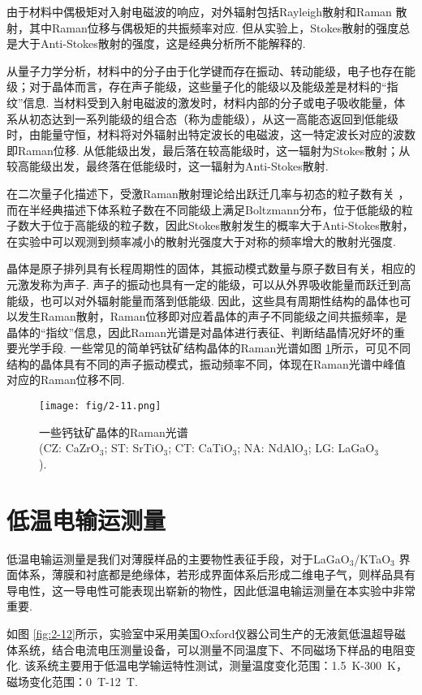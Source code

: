 \documentclass[12pt,a4paper,openany,twoside,UTF-8]{book}
\begin{document}
由于材料中偶极矩对入射电磁波的响应，对外辐射包括Rayleigh散射和Raman 散射，其中Raman位移与偶极矩的共振频率对应. 但从实验上，Stokes散射的强度总是大于Anti-Stokes散射的强度，这是经典分析所不能解释的. 

从量子力学分析，材料中的分子由于化学键而存在振动、转动能级，电子也存在能级；对于晶体而言，存在声子能级，这些量子化的能级以及能级差是材料的“指纹”信息. 当材料受到入射电磁波的激发时，材料内部的分子或电子吸收能量，体系从初态达到一系列能级的组合态（称为虚能级），从这一高能态返回到低能级时，由能量守恒，材料将对外辐射出特定波长的电磁波，这一特定波长对应的波数即Raman位移. 从低能级出发，最后落在较高能级时，这一辐射为Stokes散射；从较高能级出发，最终落在低能级时，这一辐射为Anti-Stokes散射. 

在二次量子化描述下，受激Raman散射理论给出跃迁几率与初态的粒子数有关 \cite{ref31}，而在半经典描述下体系粒子数在不同能级上满足Boltzmann分布，位于低能级的粒子数大于位于高能级的粒子数，因此Stokes散射发生的概率大于Anti-Stokes散射，在实验中可以观测到频率减小的散射光强度大于对称的频率增大的散射光强度.

晶体是原子排列具有长程周期性的固体，其振动模式数量与原子数目有关，相应的元激发称为声子. 声子的振动也具有一定的能级，可以从外界吸收能量而跃迁到高能级，也可以对外辐射能量而落到低能级. 因此，这些具有周期性结构的晶体也可以发生Raman散射，Raman位移即对应着晶体的声子不同能级之间共振频率，是晶体的“指纹”信息，因此Raman光谱是对晶体进行表征、判断结晶情况好坏的重要光学手段. 一些常见的简单钙钛矿结构晶体的Raman光谱如图 \ref{fig:2-11}所示，可见不同结构的晶体具有不同的声子振动模式，振动频率不同，体现在Raman光谱中峰值对应的Raman位移不同.

\begin{figure}[htbp]
\centering
\texttt{[image: fig/2-11.png]}
\caption{一些钙钛矿晶体的Raman光谱 \cite{ref32}\\
(CZ: CaZrO$_3$; ST: SrTiO$_3$; CT: CaTiO$_3$; NA: NdAlO$_3$; LG: LaGaO$_3$).}
\label{fig:2-11} 
\end{figure}

\section{低温电输运测量}
低温电输运测量是我们对薄膜样品的主要物性表征手段，对于LaGaO$_3$/KTaO$_3$ 界面体系，薄膜和衬底都是绝缘体，若形成界面体系后形成二维电子气，则样品具有导电性，这一导电性可能表现出崭新的物性，因此低温电输运测量在本实验中非常重要. 

如图 \ref{fig:2-12}所示，实验室中采用美国Oxford仪器公司生产的无液氦低温超导磁体系统，结合电流电压测量设备，可以测量不同温度下、不同磁场下样品的电阻变化. 该系统主要用于低温电学输运特性测试，测量温度变化范围：\SI{1.5}{K}-\SI{300}{K}，磁场变化范围：\SI{0}{T}-\SI{12}{T}.
\end{document}
